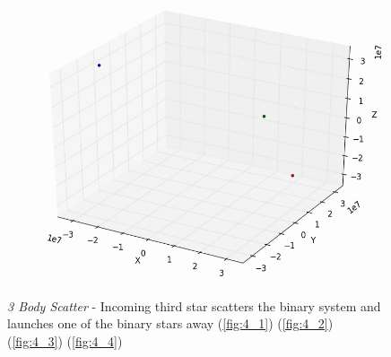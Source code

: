 \documentclass[10pt,letterpaper]{article}
\begin{document}
\begin{figure}[!htb]
  \subcaption{}\label{fig:4_3}
\endminipage
{}
  \includegraphics[width=\linewidth]{figures/three_body/4_4.png}
  \subcaption{}\label{fig:4_4}
\endminipage
\caption{ \textit{3 Body Scatter} - Incoming third star scatters the binary system and launches one of the binary stars away
(\ref{fig:4_1}) 
(\ref{fig:4_2}) 
(\ref{fig:4_3}) 
(\ref{fig:4_4})}\label{fig:4}
\end{figure}
\end{document}
